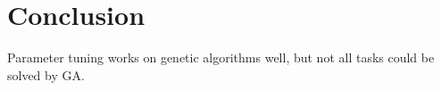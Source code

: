 \chapter{Conclusion}
Parameter tuning works on genetic algorithms well, but not all tasks could be solved by GA.